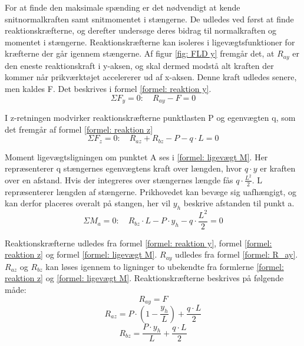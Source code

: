 For at finde den maksimale spænding er det nødvendigt at kende snitnormalkraften samt snitmomentet i stængerne. De udledes ved først at finde reaktionskræfterne, og derefter undersøge deres bidrag til normalkraften og momentet i stængerne. Reaktionskræfterne kan isoleres i ligevægtsfunktioner for kræfterne der går igennem stængerne. Af figur \ref{fig: FLD y} fremgår det, at $R_{ay}$ er den eneste reaktionskraft i y-aksen, og skal dermed modstå alt kraften der kommer når prikværktøjet accelererer ud af x-aksen. Denne kraft udledes senere, men kaldes F. Det beskrives i formel \ref{formel: reaktion y}.
\begin{equation} \label{formel: reaktion y}
    \Sigma F_y=0:  \quad
    R_{ay}-F=0
\end{equation}

I z-retningen modvirker reaktionskræfterne punktlasten P og egenvægten q, som det fremgår af formel \ref{formel: reaktion z}
\begin{equation} \label{formel: reaktion z}
    \Sigma F_z=0: \quad
    R_{az}+R_{bz}-P-q\cdot L=0
\end{equation}

Moment ligevægtsligningen om punktet A ses i \ref{formel: ligevægt M}. Her repræsenterer q stængernes egenvægtens kraft over længden, hvor $q\cdot y$ er kraften over en afstand. Hvis der integreres over stængernes længde fås $q\cdot \frac{L^2}{2}$. L repræsenterer længden af stængerne. Prikhovedet kan bevæge sig uafhængigt, og kan derfor placeres overalt på stangen, her vil $y_h$ beskrive afstanden til punkt a. 
\begin{equation} \label{formel: ligevægt M}
    \Sigma M_a=0: \quad
    R_{bz}\cdot L-P\cdot y_h-q\cdot\frac{L^2}{2}=0
\end{equation}

Reaktionskræfterne udledes fra formel \ref{formel: reaktion y}, formel \ref{formel: reaktion z} og formel \ref{formel: ligevægt M}. $R_{ay}$ udledes fra formel \ref{formel: R_ay}. $R_{az}$ og $R_{bz}$ kan løses igennem to ligninger to ubekendte fra formlerne \ref{formel: reaktion z} og \ref{formel: ligevægt M}. Reaktionskræfterne beskrives på følgende måde:
\begin{equation} \label{formel: R_ay}
    R_{ay}=F
\end{equation}
\begin{equation} \label{formel: R_az}
    R_{az}=P\cdot(1-\frac{y_h}{L})+\frac {q\cdot L}{2}
\end{equation}
\begin{equation} \label{formel: R_bz}
    R_{bz}=\frac{P\cdot y_h}{L}+\frac {q\cdot L}{2}
\end{equation}

